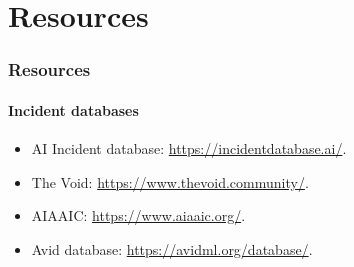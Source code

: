 \documentclass[11pt,
               aspectratio=169,
               hyperref={colorlinks}
               ]{beamer}
\begin{document}
	\section{Resources} 

\begin{frame}
	
	\frametitle{Resources}
	\framesubtitle{Incident databases}
	
	\begin{itemize}
		\item AI Incident database: \url{https://incidentdatabase.ai/}.
		\item The Void: \url{https://www.thevoid.community/}.
		\item AIAAIC: \url{https://www.aiaaic.org/}.
		\item Avid database: \url{https://avidml.org/database/}.
	\end{itemize}	
	
\end{frame}
\end{document}
